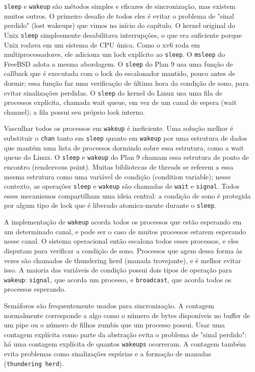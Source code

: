 {\lstinline{sleep}
e
\lstinline{wakeup}
são métodos simples e eficazes de sincronização,
mas existem muitos outros.
O primeiro desafio de todos eles é
evitar o problema de "sinal perdido" (lost wakeups) que vimos no
início do capítulo.
O kernel original do Unix
\lstinline{sleep}
simplesmente desabilitava interrupções,
o que era suficiente porque Unix rodava em um sistema de CPU única.
Como o xv6 roda em multiprocessadores,
ele adiciona um lock explícito ao
\lstinline{sleep}.
O \lstinline{msleep} do FreeBSD
adota a mesma abordagem.
O \lstinline{sleep} do Plan 9
usa uma função de callback que é executada com o lock do escalonador
mantido, pouco antes de dormir;
essa função faz uma verificação de última hora
da condição de sono, para evitar sinalizações perdidas.
O \lstinline{sleep} do kernel do Linux
usa uma fila de processos explícita, chamada wait queue, em vez de
um canal de espera (wait channel); a fila possui seu próprio lock interno.

Vasculhar todos os processos em
\lstinline{wakeup}
é ineficiente. Uma solução melhor é
substituir o
\lstinline{chan}
tanto em
\lstinline{sleep}
quanto em
\lstinline{wakeup}
por uma estrutura de dados que mantém
uma lista de processos dormindo sobre essa estrutura,
como a wait queue do Linux.
O \lstinline{sleep} e \lstinline{wakeup} do Plan 9
chamam essa estrutura de ponto de encontro (rendezvous point).
Muitas bibliotecas de threads se referem a essa mesma
estrutura como uma variável de condição (condition variable);
nesse contexto, as operações
\lstinline{sleep}
e
\lstinline{wakeup}
são chamadas de
\lstinline{wait}
e
\lstinline{signal}.
Todos esses mecanismos compartilham uma ideia central:
a condição de sono é protegida por algum tipo de lock
que é liberado atomica-mente durante o \lstinline{sleep}.

A implementação de
\lstinline{wakeup}
acorda todos os processos que estão esperando em um determinado canal,
e pode ser o caso de muitos processos estarem esperando nesse canal.
O sistema operacional então escalona todos esses processos, e eles disputam
para verificar a condição de sono. Processos que agem dessa forma às vezes
são chamados de
thundering herd (manada trovejante),
e é melhor evitar isso.
A maioria das variáveis de condição possui dois tipos de operação para
\lstinline{wakeup}:
\lstinline{signal},
que acorda um processo, e
\lstinline{broadcast},
que acorda todos os processos esperando.

Semáforos são frequentemente usados para sincronização.
A contagem normalmente corresponde a algo como
o número de bytes disponíveis no buffer de um pipe
ou o número de filhos zumbis que um processo possui.
Usar uma contagem explícita como parte da abstração
evita o problema de "sinal perdido":
há uma contagem explícita de quantos
\lstinline{wakeups}
ocorreram.
A contagem também evita problemas como sinalizações espúrias
e a formação de manadas (\lstinline{thundering herd}).

}
